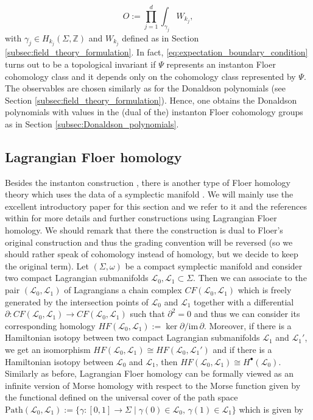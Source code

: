 \documentclass[11pt,colorinlistoftodos]{amsart}
\numberwithin{equation}{subsection}
\theoremstyle{plain}
\theoremstyle{definition}
\theoremstyle{remark}
\newcommand{\Z}{\mathbb{Z}}
\newcommand{\de}{\partial}
\newcommand{\calL}{\mathcal{L}}
\begin{document}
\begin{equation}
\label{eq:observable}
O:=\prod_{j=1}^d\int_{\gamma_j}W_{k_j},
\end{equation}
with $\gamma_j\in H_{k_j}(\Sigma,\Z)$ and $W_{k_j}$ defined as in Section \ref{subsec:field_theory_formulation}.
In fact, \eqref{eq:expectation_boundary_condition} turns out to be a topological invariant if $\Psi$ represents an instanton Floer cohomology class and it depends only on the cohomology class represented by $\Psi$. The observables are chosen similarly as for the Donaldson polynomials (see Section \ref{subsec:field_theory_formulation}). Hence, one obtains the Donaldson polynomials with values in the (dual of the) instanton Floer cohomology groups as in Section \ref{subsec:Donaldson_polynomials}.

\subsection{Lagrangian Floer homology}
\label{subsec:Lagrangian_Floer_homology}
Besides the instanton construction \cite{Floer1989}, there is another type of Floer homology theory which uses the data of a symplectic manifold \cite{Floer1988b}. We will mainly use the excellent introductory paper \cite{Auroux2014} for this section and we refer to it and the references within for more details and further constructions using Lagrangian Floer homology. We should remark that there the construction is dual to Floer's original construction and thus the grading convention will be reversed (so we should rather speak of cohomology instead of homology, but we decide to keep the original term).
Let $(\Sigma,\omega)$ be a compact symplectic manifold and consider two compact Lagrangian submanifolds $\calL_0,\calL_1\subset \Sigma$. Then we can associate to the pair $(\calL_0,\calL_1)$ of Lagrangians a chain complex $CF(\calL_0,\calL_1)$ which is freely generated by the intersection points of $\calL_0$ and $\calL_1$ together with a differential $\de\colon CF(\calL_0,\calL_1)\to CF(\calL_0,\calL_1)$ such that $\de^2=0$ and thus we can consider its corresponding homology $HF(\calL_0,\calL_1):=\ker \de/\mathrm{im}\, \de$.
Moreover, if there is a Hamiltonian isotopy between two compact Lagrangian submanifolds $\calL_1$ and $\calL_1'$, we get an isomorphism $HF(\calL_0,\calL_1)\cong HF(\calL_0,\calL_1')$ and if there is a Hamiltonian isotopy between $\calL_0$ and $\calL_1$, then $HF(\calL_0,\calL_1)\cong H^\bullet(\calL_0)$. Similarly as before, Lagrangian Floer homology can be formally viewed as an infinite version of Morse homology with respect to the Morse function given by the functional defined on the universal cover of the path space $\mathrm{Path}(\calL_0,\calL_1):=\{\gamma\colon[0,1]\to \Sigma\mid \gamma(0)\in \calL_0,\, \gamma(1)\in \calL_1\}$ which is given by 
\end{document}
